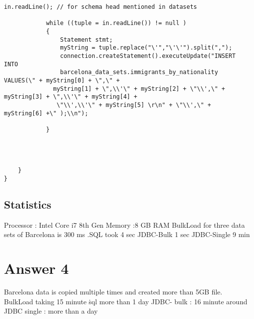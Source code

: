 \documentclass[10pt]{article}
\begin{document}
\begin{lstlisting}[frame=single]
            in.readLine(); // for schema head mentioned in datasets
            
			while ((tuple = in.readLine()) != null )
			{
				Statement stmt;				
				myString = tuple.replace("\'","\'\'").split(",");								
				connection.createStatement().executeUpdate("INSERT INTO
                barcelona_data_sets.immigrants_by_nationality VALUES(\" + myString[0] + \",\" +
              myString[1] + \",\\'\" + myString[2] + \"\\',\" + myString[3] + \",\\'\" + myString[4] +
               \"\\',\\'\" + myString[5] \r\n" + \"\\',\" + myString[6] +\" );\\n");

			}
			
            
			
		
	}
}

\end{lstlisting}

\subsection{Statistics}

Processor : Intel Core i7 8th Gen \newline
 Memory :8 GB RAM \newline
 BulkLoad for three data sets of Barcelona is 300 ms \newline
 .SQL took 4 sec \newline
 JDBC-Bulk 1 sec \newline
 JDBC-Single 9 min \newline








\section{Answer 4}

Barcelona data is copied multiple times and created more than 5GB file.\newline
BulkLoad taking 15 minute\newline
\.sql more than 1 day\newline
JDBC- bulk : 16 minute around\newline
JDBC single : more than a day\newline
\end{document}
